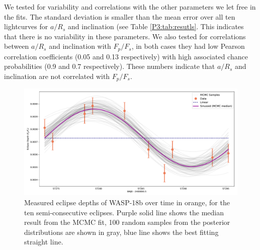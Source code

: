 We tested for variability and correlations with the other parameters we let free in the fits. The standard deviation is smaller than the mean error over all ten lightcurves for $a/R_s$ and inclination (see Table \ref{P3:tab:resutls}. This indicates that there is no variability in these parameters. We also tested for correlations between $a/R_s$ and inclination with $F_p/F_s$, in both cases they had low Pearson correlation coefficients (0.05 and 0.13 respectively) with high associated chance probabilities (0.9 and 0.7 respectively). These numbers indicate that $a/R_s$ and inclination are not correlated with $F_p/F_s$.

\begin{figure}
    \centering
    \includegraphics[width=\linewidth]{MCMCvarsamples.pdf}
    \caption{Measured eclipse depths of WASP-18b over time in orange, for the ten semi-consecutive eclipses. Purple solid line shows the median result from the MCMC fit, 100 random samples from the posterior distributions are shown in gray, blue line shows the best fitting straight line.}
    \label{P3:fig:variability}
\end{figure}

